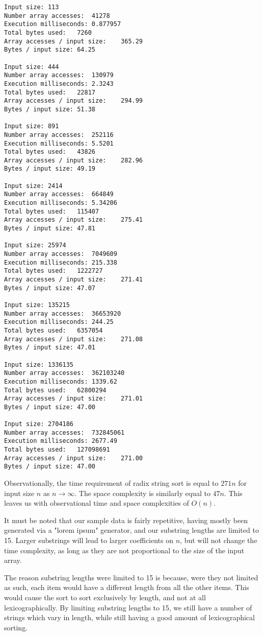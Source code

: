 \documentclass[12pt]{amsart}
\begin{document}
\begin{verbatim}
Input size:	113
Number array accesses:	41278
Execution milliseconds:	0.877957
Total bytes used:	7260
Array accesses / input size:    365.29
Bytes / input size: 64.25

Input size:	444
Number array accesses:	130979
Execution milliseconds:	2.3243
Total bytes used:	22817
Array accesses / input size:    294.99
Bytes / input size: 51.38

Input size:	891
Number array accesses:	252116
Execution milliseconds:	5.5201
Total bytes used:	43826
Array accesses / input size:    282.96
Bytes / input size: 49.19

Input size:	2414
Number array accesses:	664849
Execution milliseconds:	5.34206
Total bytes used:	115407
Array accesses / input size:    275.41
Bytes / input size: 47.81

Input size:	25974
Number array accesses:	7049609
Execution milliseconds:	215.338
Total bytes used:	1222727
Array accesses / input size:    271.41
Bytes / input size: 47.07

Input size:	135215
Number array accesses:	36653920
Execution milliseconds:	244.25
Total bytes used:	6357054
Array accesses / input size:    271.08
Bytes / input size: 47.01

Input size:	1336135
Number array accesses:	362103240
Execution milliseconds:	1339.62
Total bytes used:	62800294
Array accesses / input size:    271.01
Bytes / input size: 47.00

Input size:	2704186
Number array accesses:	732845061
Execution milliseconds:	2677.49
Total bytes used:	127098691
Array accesses / input size:    271.00
Bytes / input size: 47.00

\end{verbatim}

    Observationally, the time requirement of radix string sort
    is equal to $271n$ for input size $n$ as $n \to \infty$. The
    space complexity is similarly equal to $47n$. This leaves
    us with observational time and space complexities of $O(n)$.

    It must be noted that our sample data is fairly repetitive,
    having mostly been generated via a "lorem ipsum" generator,
    and our substring lengths are limited to 15. Larger
    substrings will lead to larger coefficients on $n$, but will
    not change the time complexity, as long as they are not
    proportional to the size of the input array.

    The reason substring lengths were limited to 15 is because,
    were they not limited as such, each item would have a
    different length from all the other items. This would cause
    the sort to sort exclusively by length, and not at all
    lexicographically. By limiting substring lengths to 15, we
    still have a number of strings which vary in length, while
    still having a good amount of lexicographical sorting.
\end{document}
